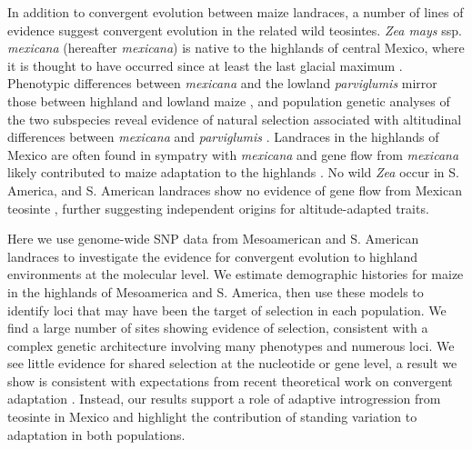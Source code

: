 In addition to convergent evolution between maize landraces, a number of lines of evidence suggest convergent evolution in the related wild teosintes.  
\emph{Zea mays} ssp. \emph{mexicana} (hereafter \emph{mexicana}) is native to the highlands of central Mexico, where it is thought to have occurred since at least the last glacial maximum \cite[]{Ross-Ibarra_2009_19153259, Hufford_niche}. 
Phenotypic differences between \emph{mexicana} and the lowland \emph{parviglumis} mirror those between highland and lowland maize \cite[]{Lauter_2004_15342532}, and population genetic analyses of the two subspecies reveal evidence of natural selection associated with altitudinal differences between \emph{mexicana} and \emph{parviglumis} \cite[]{Pyhajarvi2013,fang2012megabase}.  
Landraces in the highlands of Mexico are often found in sympatry with \emph{mexicana} and gene flow from \emph{mexicana} likely contributed to maize adaptation to the highlands \cite[]{Profford_2013}. 
No wild \emph{Zea} occur in S. America, and S. American landraces show no evidence of gene flow from Mexican teosinte \cite[]{vanHeerwaarden_2011_21189301}, 
further suggesting independent origins for altitude-adapted traits.

Here we use genome-wide SNP data from Mesoamerican and S. American landraces to investigate the evidence for convergent evolution to highland environments at the molecular level.  
We estimate demographic histories for maize in the highlands of Mesoamerica and S. America, then use these models to identify loci that may have been the target of selection in each population.
We find a large number of sites showing evidence of selection, consistent with a complex genetic architecture involving many phenotypes and numerous loci.  
We see little evidence for shared selection at the nucleotide or gene level, a result we show is consistent with expectations from recent theoretical work on convergent adaptation \cite[]{ralph2014convergent}.
Instead, our results support a role of adaptive introgression from teosinte in Mexico and highlight the contribution of standing variation to adaptation in both populations.
